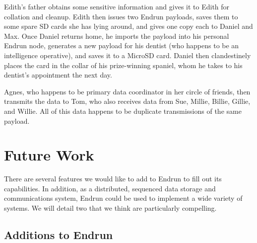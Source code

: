 \documentclass[12pt]{article}
\begin{document}
  Edith's father obtains some sensitive information and gives it to Edith for collation and cleanup. Edith then issues two Endrun payloads, saves them to some spare SD cards she has lying around, and gives one copy each to Daniel and Max. Once Daniel returns home, he imports the payload into his personal Endrun node, generates a new payload for his dentist (who happens to be an intelligence operative), and saves it to a MicroSD card. Daniel then clandestinely places the card in the collar of his prize-winning spaniel, whom he takes to his dentist's appointment the next day.
  
  Agnes, who happens to be primary data coordinator in her circle of friends, then transmits the data to Tom, who also receives data from Sue, Millie, Billie, Gillie, and Willie. All of this data happens to be duplicate transmissions of the same payload.
  
  \section{Future Work}
  
  There are several features we would like to add to Endrun to fill out its capabilities. In addition, as a distributed, sequenced data storage and communications system, Endrun could be used to implement a wide variety of systems. We will detail two that we think are particularly compelling.
  
  \subsection{Additions to Endrun}
  
\end{document}
